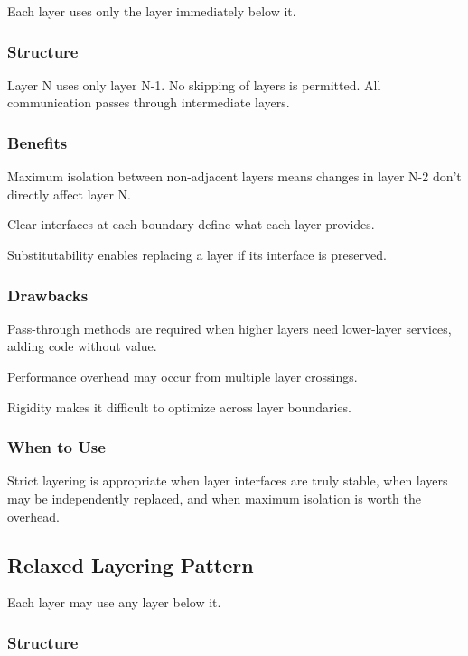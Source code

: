 \documentclass[11pt]{article}
\begin{document}
Each layer uses only the layer immediately below it.

\subsubsection{Structure}

Layer N uses only layer N-1. No skipping of layers is permitted. All communication passes through intermediate layers.

\subsubsection{Benefits}

Maximum isolation between non-adjacent layers means changes in layer N-2 don't directly affect layer N.

Clear interfaces at each boundary define what each layer provides.

Substitutability enables replacing a layer if its interface is preserved.

\subsubsection{Drawbacks}

Pass-through methods are required when higher layers need lower-layer services, adding code without value.

Performance overhead may occur from multiple layer crossings.

Rigidity makes it difficult to optimize across layer boundaries.

\subsubsection{When to Use}

Strict layering is appropriate when layer interfaces are truly stable, when layers may be independently replaced, and when maximum isolation is worth the overhead.

\subsection{Relaxed Layering Pattern}

Each layer may use any layer below it.

\subsubsection{Structure}
\end{document}
